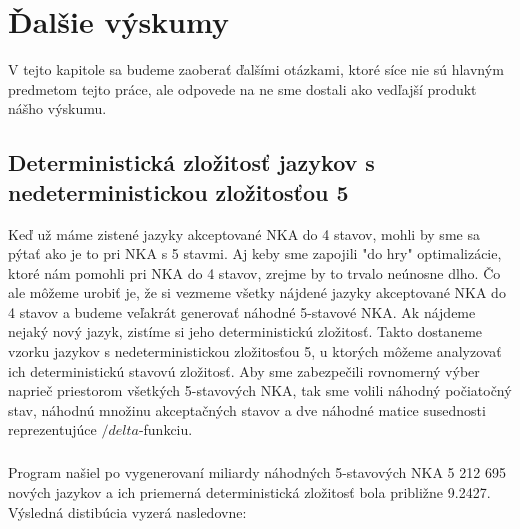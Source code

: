 \chapter{Ďalšie výskumy}

V tejto kapitole sa budeme zaoberať ďalšími otázkami, ktoré síce nie sú hlavným predmetom tejto práce, ale odpovede na ne sme dostali ako vedľajší produkt nášho výskumu.

\section{Deterministická zložitosť jazykov s nedeterministickou zložitosťou 5}

Keď už máme zistené jazyky akceptované NKA do 4 stavov, mohli by sme sa pýtať ako je to pri NKA s 5 stavmi. Aj keby sme zapojili "do hry" optimalizácie, ktoré nám pomohli pri NKA do 4 stavov, zrejme by to trvalo neúnosne dlho. Čo ale môžeme urobiť je, že si vezmeme všetky nájdené jazyky akceptované NKA do 4 stavov a budeme veľakrát generovať náhodné 5-stavové NKA. Ak nájdeme nejaký nový jazyk, zistíme si jeho deterministickú zložitosť. Takto dostaneme vzorku jazykov s nedeterministickou zložitosťou 5, u ktorých môžeme analyzovať ich deterministickú stavovú zložitosť. Aby sme zabezpečili rovnomerný výber naprieč priestorom všetkých 5-stavových NKA, tak sme volili náhodný počiatočný stav, náhodnú množinu akceptačných stavov a dve náhodné matice susednosti reprezentujúce $/delta$-funkciu.

\paragraph{}
Program našiel po vygenerovaní miliardy náhodných 5-stavových NKA 5 212 695 nových jazykov a ich priemerná deterministická zložitosť bola približne 9.2427. Výsledná distibúcia vyzerá nasledovne:
\pagebreak

